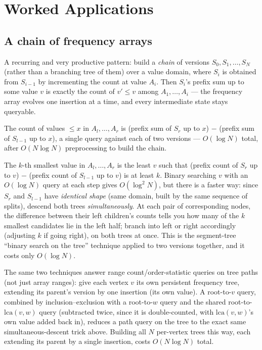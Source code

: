 \documentclass[11pt]{article}
\begin{document}
\section{Worked Applications}

\subsection{A chain of frequency arrays}
A recurring and very productive pattern: build a \emph{chain} of versions
$S_0, S_1, \ldots, S_N$ (rather than a branching tree of them) over a
value domain, where $S_i$ is obtained from $S_{i-1}$ by incrementing the
count at value $A_i$. Then $S_i$'s prefix sum up to some value $v$ is
exactly the count of $v' \le v$ among $A_1, \ldots, A_i$ --- the frequency
array evolves one insertion at a time, and every intermediate state stays
queryable.

\begin{examplebox}
The count of values $\le x$ in $A_l, \ldots, A_r$ is (prefix sum of $S_r$
up to $x$) $-$ (prefix sum of $S_{l-1}$ up to $x$), a single query against
each of two versions --- $O(\log N)$ total, after $O(N \log N)$
preprocessing to build the chain.
\end{examplebox}

\begin{examplebox}
The $k$-th smallest value in $A_l, \ldots, A_r$ is the least $v$ such that
(prefix count of $S_r$ up to $v$) $-$ (prefix count of $S_{l-1}$ up to $v$)
is at least $k$. Binary searching $v$ with an $O(\log N)$ query at each
step gives $O(\log^2 N)$, but there is a faster way: since $S_r$ and
$S_{l-1}$ have \emph{identical shape} (same domain, built by the same
sequence of splits), descend both trees \emph{simultaneously}. At each
pair of corresponding nodes, the difference between their left children's
counts tells you how many of the $k$ smallest candidates lie in the left
half; branch into left or right accordingly (adjusting $k$ if going
right), on both trees at once. This is the segment-tree ``binary search on
the tree'' technique applied to two versions together, and it costs only
$O(\log N)$.
\end{examplebox}

\begin{notebox}
The same two techniques answer range count/order-statistic queries on tree
paths (not just array ranges): give each vertex $v$ its own persistent
frequency tree, extending its parent's version by one insertion (its own
value). A root-to-$v$ query, combined by inclusion–exclusion with a
root-to-$w$ query and the shared root-to-$\mathrm{lca}(v,w)$ query
(subtracted twice, since it is double-counted, with $\mathrm{lca}(v,w)$'s
own value added back in), reduces a path query on the tree to the exact
same simultaneous-descent trick above. Building all $N$ per-vertex trees
this way, each extending its parent by a single insertion, costs
$O(N \log N)$ total.
\end{notebox}
\end{document}
